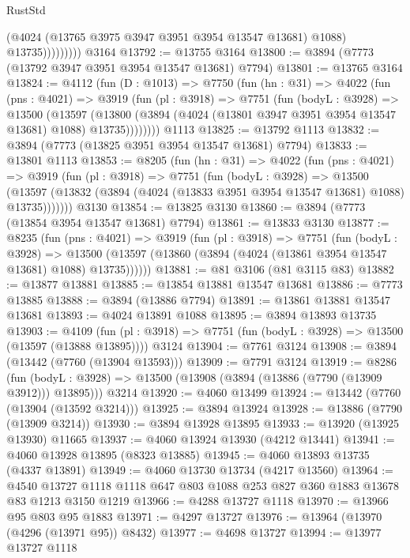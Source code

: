 \begin{lexlean}{RustStd}
\begin{coremodule}
                      (@4024 (@13765 @3975 @3947 @3951 @3954 @13547 @13681) @1088)
                      @13735)))))))))
    @3164
@13792 := @13755 @3164
@13800 := @3894 (@7773 (@13792 @3947 @3951 @3954 @13547 @13681) @7794)
@13801 := @13765 @3164
@13824 := @4112
    (fun (D : @1013) =>
    @7750
      (fun (hn : @31) =>
      @4022
        (fun (pns : @4021) =>
        @3919
          (fun (pl : @3918) =>
          @7751
            (fun (bodyL : @3928) =>
            @13500
              (@13597
                (@13800 (@3894 (@4024 (@13801 @3947 @3951 @3954 @13547 @13681) @1088) @13735))))))))
    @1113
@13825 := @13792 @1113
@13832 := @3894 (@7773 (@13825 @3951 @3954 @13547 @13681) @7794)
@13833 := @13801 @1113
@13853 := @8205
    (fun (hn : @31) =>
    @4022
      (fun (pns : @4021) =>
      @3919
        (fun (pl : @3918) =>
        @7751
          (fun (bodyL : @3928) =>
          @13500
            (@13597 (@13832 (@3894 (@4024 (@13833 @3951 @3954 @13547 @13681) @1088) @13735)))))))
    @3130
@13854 := @13825 @3130
@13860 := @3894 (@7773 (@13854 @3954 @13547 @13681) @7794)
@13861 := @13833 @3130
@13877 := @8235
    (fun (pns : @4021) =>
    @3919
      (fun (pl : @3918) =>
      @7751
        (fun (bodyL : @3928) =>
        @13500 (@13597 (@13860 (@3894 (@4024 (@13861 @3954 @13547 @13681) @1088) @13735))))))
@13881 := @81 @3106 (@81 @3115 @83)
@13882 := @13877 @13881
@13885 := @13854 @13881 @13547 @13681
@13886 := @7773 @13885
@13888 := @3894 (@13886 @7794)
@13891 := @13861 @13881 @13547 @13681
@13893 := @4024 @13891 @1088
@13895 := @3894 @13893 @13735
@13903 := @4109
    (fun (pl : @3918) => @7751 (fun (bodyL : @3928) => @13500 (@13597 (@13888 @13895))))
    @3124
@13904 := @7761 @3124
@13908 := @3894 (@13442 (@7760 (@13904 @13593)))
@13909 := @7791 @3124
@13919 := @8286
    (fun (bodyL : @3928) => @13500 (@13908 (@3894 (@13886 (@7790 (@13909 @3912))) @13895)))
    @3214
@13920 := @4060 @13499
@13924 := @13442 (@7760 (@13904 (@13592 @3214)))
@13925 := @3894 @13924
@13928 := @13886 (@7790 (@13909 @3214))
@13930 := @3894 @13928 @13895
@13933 := @13920 (@13925 @13930) @11665
@13937 := @4060 @13924 @13930 (@4212 @13441)
@13941 := @4060 @13928 @13895 (@8323 @13885)
@13945 := @4060 @13893 @13735 (@4337 @13891)
@13949 := @4060 @13730 @13734 (@4217 @13560)
@13964 := @4540 @13727 @1118 @1118 @647 @803 @1088 @253 @827 @360 @1883 @13678 @83 @1213 @3150 @1219
@13966 := @4288 @13727 @1118
@13970 := @13966 @95 @803 @95 @1883
@13971 := @4297 @13727
@13976 := @13964 (@13970 (@4296 (@13971 @95)) @8432)
@13977 := @4698 @13727
@13994 := @13977
    @13727
    @1118

\end{coremodule}
\end{lexlean}
